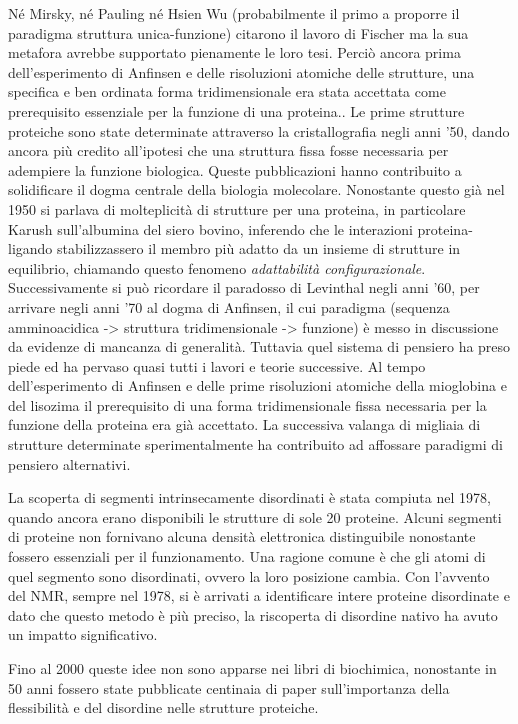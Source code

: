 {Né Mirsky, né Pauling né Hsien Wu (probabilmente il primo a proporre il paradigma struttura unica-funzione) citarono il lavoro di Fischer ma la sua metafora avrebbe supportato pienamente le loro tesi. Perciò ancora prima dell'esperimento di Anfinsen e delle risoluzioni atomiche delle strutture, una specifica e ben ordinata forma tridimensionale era stata accettata come prerequisito essenziale per la funzione di una proteina.\supercite{dunker2001intrinsically}. Le prime strutture proteiche sono state determinate attraverso la cristallografia negli anni '50, dando ancora più credito all'ipotesi che una struttura fissa fosse necessaria per adempiere la funzione biologica. Queste pubblicazioni hanno contribuito a solidificare il dogma centrale della biologia molecolare. Nonostante questo già nel 1950 si parlava di molteplicità di strutture per una proteina, in particolare Karush\supercite{karush1950heterogeneity} sull'albumina del siero bovino, inferendo che le interazioni proteina-ligando stabilizzassero il membro più adatto da un insieme di strutture in equilibrio, chiamando questo fenomeno \textit{adattabilità configurazionale}. Successivamente si può ricordare il paradosso di Levinthal negli anni '60, per arrivare negli anni '70 al dogma di Anfinsen, il cui paradigma (sequenza amminoacidica -> struttura tridimensionale -> funzione) è messo in discussione da evidenze di mancanza di generalità. Tuttavia quel sistema di pensiero ha preso piede ed ha pervaso quasi tutti i lavori e teorie successive. Al tempo dell'esperimento di Anfinsen e delle prime risoluzioni atomiche della mioglobina e del lisozima il prerequisito di una forma tridimensionale fissa necessaria per la funzione della proteina era già accettato. La successiva valanga di migliaia di strutture determinate sperimentalmente ha contribuito ad affossare paradigmi di pensiero alternativi.

\par La scoperta di segmenti intrinsecamente disordinati è stata compiuta nel 1978, quando ancora erano disponibili le strutture di sole 20 proteine. Alcuni segmenti di proteine non fornivano alcuna densità elettronica distinguibile nonostante fossero essenziali per il funzionamento. Una  ragione comune è che gli atomi di quel segmento sono disordinati, ovvero la loro posizione cambia. Con l'avvento del NMR, sempre nel 1978, si è arrivati a identificare intere proteine disordinate e dato che questo metodo è più preciso, la riscoperta di disordine nativo ha avuto un impatto significativo.

\par Fino al 2000\supercite{bracken2000disorder} queste idee non sono apparse nei libri di biochimica, nonostante in 50 anni fossero state pubblicate centinaia di paper sull'importanza della flessibilità e del disordine nelle strutture proteiche.

}
